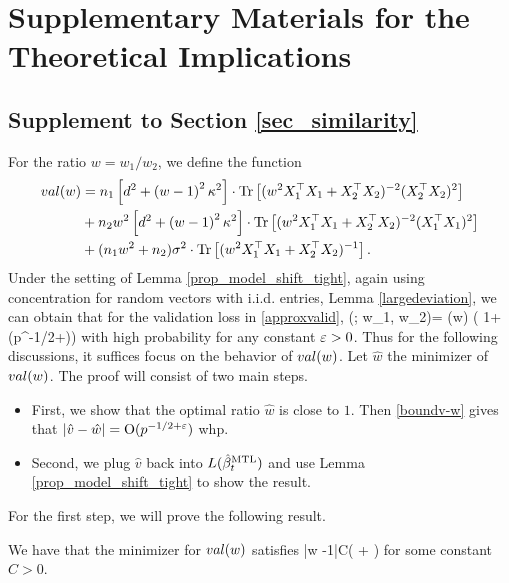 \section{Supplementary Materials for the Theoretical Implications}

\subsection{Supplement to Section \ref{sec_similarity}}\label{app_proof_31}

For the ratio $w=w_1/w_2$, we define the function
\begin{align}
	val(w) &= n_1\left[d^2 +\left( w-1\right)^2\kappa^2\right]\cdot \operatorname{Tr}\left[( w^2X_1^{\top}X_1 +X_2^{\top}X_2)^{-2} (X_2^{\top}X_2)^2\right] \nonumber \\
	& + n_2w^2\left[d^2 +\left( w-1\right)^2\kappa^2\right]\cdot \operatorname{Tr}\left[( w^2X_1^{\top}X_1 +X_2^{\top}X_2)^{-2} (X_1^{\top}X_1)^2\right] \nonumber\\
			& + (n_1 w^2 +n_2)\sigma^2 \cdot \operatorname{Tr}\left[(w^2X_1^{\top}X_1  + X_2^{\top}X_2)^{-1} \right]. \nonumber
\end{align}
\cor Under the setting of Lemma \ref{prop_model_shift_tight}, again using concentration for random vectors with i.i.d. entries, Lemma \ref{largedeviation}, we can obtain that for the validation loss in \eqref{approxvalid},
\be\label{boundv-w}\val(; w_1, w_2)= \val(w) \left( 1+\OO(p^{-1/2+\e})\right)\ee
with high probability for any constant ${\varepsilon}>0$. \nc Thus for the following discussions, it suffices focus on the behavior of $val (w)$. Let $\hat w$ the minimizer of $val(w)$. The proof will consist of two main steps.
\begin{itemize}
	\item First, we show that the optimal ratio $\hat{w}$ is close to $1$. Then \eqref{boundv-w} gives that $|\hat v - \hat w|=\operatorname{O}(p^{-1/2+{\varepsilon}})$ whp.
	\item Second, we plug $\hat{v}$ back into $L(\hat{\beta}_t^{\text{MTL}})$ and use Lemma \ref{prop_model_shift_tight} to show the result.
\end{itemize}
For the first step, we will prove the following result.
\begin{lemma}\label{lem_hat_v}
We have that the minimizer for $val(w)$ satisfies
	\be\label{hatw_add1}|\hat w -1|\le C\left( + \right)\ee
	for some constant $C>0$.
\end{lemma}
